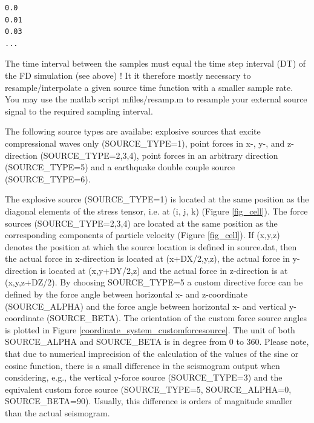 \documentclass[11pt,onecolumn,oneside]{article}
\begin{document}
\begin{verbatim}
0.0
0.01
0.03
...
\end{verbatim}

The time interval between the samples must equal the time step interval (DT) of the FD simulation (see above) ! It it therefore mostly necessary to resample/interpolate a given source time function with a smaller sample rate. You may use the matlab script mfiles/resamp.m to resample your external source signal to the required sampling interval.

The following source types are availabe: explosive sources that excite compressional waves
only (SOURCE\_TYPE=1), point forces in x-, y-, and z-direction (SOURCE\_TYPE=2,3,4), point forces in an arbitrary direction (SOURCE\_TYPE=5) and a earthquake double couple source (SOURCE\_TYPE=6).

The explosive source (SOURCE\_TYPE=1) is located at the same position as the diagonal elements of the stress tensor, i.e. at (i, j, k) (Figure \ref{fig_cell}).
The force sources (SOURCE\_TYPE=2,3,4) are located at the same position as the corresponding components of particle velocity (Figure \ref{fig_cell}). If (x,y,z) denotes the position at which the source location is defined in source.dat, then the actual force in x-direction is located at (x+DX/2,y,z), the actual force in y-direction is located at (x,y+DY/2,z) and the actual force in z-direction is at (x,y,z+DZ/2). 
By choosing SOURCE\_TYPE=5 a custom directive force can be defined by the force angle between horizontal x- and z-coordinate (SOURCE\_ALPHA) and the force angle between horizontal x- and vertical y-coordinate (SOURCE\_BETA). The orientation of the custom force source angles is plotted in Figure \ref{coordinate_system_customforcesource}. The unit of both SOURCE\_ALPHA and SOURCE\_BETA is in degree from 0 to 360. Please note, that due to numerical imprecision of the calculation of the values of the sine or cosine function, there is a small difference in the seismogram output when considering, e.g., the vertical y-force source (SOURCE\_TYPE=3) and the equivalent custom force source (SOURCE\_TYPE=5, SOURCE\_ALPHA=0, SOURCE\_BETA=90). Usually, this difference is orders of magnitude smaller than the actual seismogram.
\end{document}
